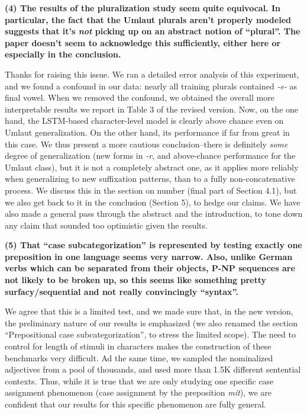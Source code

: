 \documentclass{article}
\begin{document}
\textbf{(4) The results of the pluralization study seem quite equivocal. In particular, the fact that the Umlaut plurals aren't properly modeled suggests that it's \emph{not} picking up on an abstract notion of ``plural''. The paper doesn't seem to acknowledge this sufficiently, either here or especially in the conclusion.}

Thanks for raising this issue. We ran a detailed error analysis of this experiment, and we found a confound in our data: nearly all training plurals contained \textit{-e-} as final vowel. When we removed the confound, we obtained the overall more interpretable results we report in Table 3 of the revised version. Now, on the one hand, the LSTM-based character-level model is clearly above chance even on Umlaut generalization. On the other hand, its performance if far from great in this case. We thus present a more cautious conclusion--there is definitely \emph{some} degree of generalization (new forms in \textit{-r}, and above-chance performance for the Umlaut class), but it is not a completely abstract one, as it applies more reliably when generalizing to new suffixation patterns, than to a fully non-concatenative process. We discuss this in the section on number (final part of Section 4.1), but we also get back to it in the conclusion (Section 5), to hedge our claims. We have also made a general pass through the abstract and the introduction, to tone down any claim that sounded too optimistic given the results.
\newline

\textbf{(5) That ``case subcategorization'' is represented by testing exactly one preposition in one language seems very narrow. Also, unlike German verbs which can be separated from their objects, P-NP sequences are not likely to be broken up, so this seems like something pretty surfacy/sequential and not really convincingly ``syntax''.}

We agree that this is a limited test, and we made sure that, in the new version, the preliminary nature of our results is emphasized (we also renamed the section ``Prepositional case subcategorization'', to stress the limited scope). The need to control for length of stimuli in characters makes the construction of these benchmarks very difficult. Ad the same time, we sampled the nominalized adjectives from a pool of thousands, and used more than 1.5K different sentential contexts. Thus, while it is true that we are only studying one specific case assignment phenomenon (case assignment by the preposition \textit{mit}), we are confident that our results for this specific phenomenon are fully general.
\end{document}
